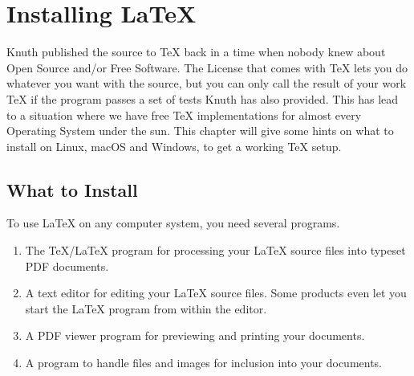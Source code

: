 %
%
%
%

\chapter{Installing \LaTeX}\label{installinglatex}
\begin{intro}
  Knuth published the source to \TeX{} back in a time when nobody knew
  about Open Source and/or Free Software. The License that comes with \TeX{}
  lets you do whatever you want with the source, but you can only call the
  result of your work \TeX{} if the program passes a set of tests Knuth has
  also provided. This has lead to a situation where we have free \TeX{}
  implementations for almost every Operating System under the sun. This chapter
  will give some hints on what to install on Linux, macOS and Windows, to
  get a working \TeX{} setup.
\end{intro}

\section{What to Install}

To use \LaTeX{} on any computer system, you need several programs.

\begin{enumerate}

  \item The \TeX{}/\LaTeX{} program for processing your \LaTeX{} source files
        into typeset PDF documents.

  \item A text editor for editing your \LaTeX{} source files. Some products even let
        you start the \LaTeX{} program from within the editor.

  \item A PDF viewer program for previewing and printing your
        documents.

  \item A program to handle \PSi{} files and images for inclusion into
        your documents.

\end{enumerate}

